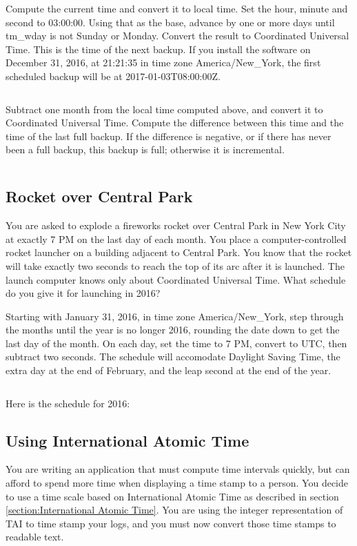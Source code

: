 \documentclass[letterpaper,twoside]{article}
\begin{document}
Compute the current time and convert it to local time.
Set the hour, minute and second to 03:00:00.
Using that as the base, advance by one or more days
until tm\_wday is not Sunday or Monday.  Convert the result
to Coordinated Universal Time.  This is the time of the
next backup.  If you install the software on December 31, 2016,
at 21:21:35 in time zone America/New\_York, the first
scheduled backup will be at 2017-01-03T08:00:00Z.
\inputminted[firstline=44,lastline=76]{c}{example_02.c}

Subtract one month from the local time computed above, and
convert it to Coordinated Universal Time.  Compute the
difference between this time and the time of the last
full backup.  If the difference is negative, or if there
has never been a full backup, this backup is full;
otherwise it is incremental.
\inputminted[firstline=78,lastline=94]{c}{example_02.c}

\subsection{Rocket over Central Park}
You are asked to explode a fireworks rocket over Central
Park in New York City at exactly 7 PM on the last day of each month.
You place a computer-controlled
rocket launcher on a building adjacent to Central Park.  You know that
the rocket will take exactly two seconds to reach the top of its
arc after it is launched.  The launch computer knows only about Coordinated
Universal Time.  What schedule do you give it for launching in 2016?

Starting with January 31, 2016, in time zone America/New\_York,
step through the months until the year is no longer 2016, rounding
the date down to get the last day of the month.
On each day, set the time to 7 PM, convert to UTC, then subtract
two seconds.  The schedule will accomodate Daylight Saving Time,
the extra day at the end of February,
and the leap second at the end of the year.
\inputminted[firstline=45,lastline=81]{c}{example_03.c}

Here is the schedule for 2016:


\subsection{Using International Atomic Time}
\label{example:TAI}
You are writing an application that must compute time intervals quickly,
but can afford to spend more time when displaying a time stamp to a person.
You decide to use a time scale based on International Atomic Time as described
in section \ref{section:International Atomic Time}.  You are using the
integer representation of TAI to time stamp your logs, and you must now convert
those time stamps to readable text.
\end{document}
